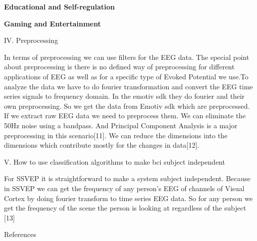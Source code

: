 \documentclass{article}
\begin{document}
\begin{multicols}{2}
\textbf{Educational and Self-regulation}

\textbf{Gaming and Entertainment}


\begin{center}
IV. Preprocessing
\end{center}

In terms of preprocessing we can use filters for the EEG data. The special point about preprocessing is there is no defined way of preprocessing for different applications of EEG as well as for a specific type of  Evoked Potential we use.To analyze the data we have to do fourier transformation and convert the EEG time series signals to frequency domain. In the emotiv sdk they do fourier and their own preprocessing. So we get the data from Emotiv sdk which are preprocessed. If we extract raw EEG data we need to preprocess them. 
We can eliminate the 50Hz noise using a bandpass. And Principal Component Analysis is a major preprocessing in this scenario[11]. We can reduce the dimensions into the dimensions which contribute mostly for the changes in data[12].

\begin{center}
V. How to use classification algorithms to make bci subject independent
\end{center}
	For SSVEP it is straightforward to make a system subject independent. Because in SSVEP we can get the frequency of any person’s EEG of channels of Visual Cortex by doing fourier transform to time series EEG data. So for any person we get the frequency of the scene the person is looking at regardless of the subject [13]

References
	  

\end{multicols}
\end{document}

